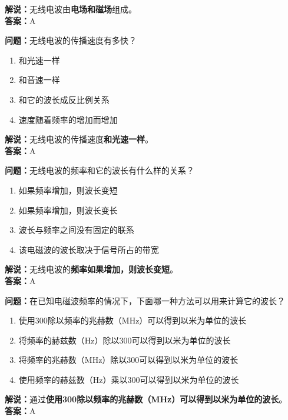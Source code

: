\textbf{解说：}无线电波由\textbf{电场和磁场}组成。\\\textbf{答案：}A%



\textbf{问题：}无线电波的传播速度有多快？

\begin{enumerate}[label=\Alph*), leftmargin=1.5cm]
	\item 和光速一样
	\item 和音速一样
	\item 和它的波长成反比例关系
	\item 速度随着频率的增加而增加
\end{enumerate}

\textbf{解说：}无线电波的传播速度\textbf{和光速一样}。\\\textbf{答案：}A



\textbf{问题：}无线电波的频率和它的波长有什么样的关系？

\begin{enumerate}[label=\Alph*), leftmargin=1.5cm]
	\item 如果频率增加，则波长变短
	\item 如果频率增加，则波长变长
	\item 波长与频率之间没有固定的联系
	\item 该电磁波的波长取决于信号所占的带宽
\end{enumerate}

\textbf{解说：}无线电波的\textbf{频率如果增加，则波长变短}。\\\textbf{答案：}A



\textbf{问题：}在已知电磁波频率的情况下，下面哪一种方法可以用来计算它的波长？

\begin{enumerate}[label=\Alph*), leftmargin=1.5cm]
	\item 使用300除以频率的兆赫数（MHz）可以得到以米为单位的波长
	\item 将频率的赫兹数（Hz）除以300可以得到以米为单位的波长
	\item 将频率的兆赫数（MHz）除以300可以得到以米为单位的波长
	\item 使用频率的赫兹数（Hz）乘以300可以得到以米为单位的波长
\end{enumerate}

\textbf{解说：}通过\textbf{使用300除以频率的兆赫数（MHz）可以得到以米为单位的波长}。\\\textbf{答案：}A



